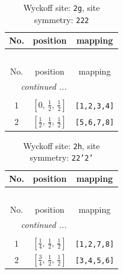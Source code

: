 \documentclass[fleqn,8pt]{jsarticle}
\begin{document}
\begin{longtable}{ccc}
\caption{Wyckoff site: {\tt 2g}, site symmetry: {\tt 222}}
 \\
 \hline \hline
No. & position & mapping \\ \hline \endfirsthead

\multicolumn{2}{l}{\tablename\ \thetable{}} \\
 \hline \hline
No. & position & mapping \\ \hline \endhead

 \hline \hline
\multicolumn{2}{r}{\footnotesize\it continued ...} \\ \endfoot

 \hline \hline
\multicolumn{2}{r}{} \\ \endlastfoot

1 & $\left[ 0,\, \frac{1}{2},\, \frac{1}{2} \right]$ & {\tt [1,2,3,4]} \\ \hline
2 & $\left[ \frac{1}{2},\, \frac{1}{2},\, \frac{1}{2} \right]$ & {\tt [5,6,7,8]} \\
\end{longtable}
\renewcommand{\arraystretch}{1.2}
\begin{longtable}{ccc}
\caption{Wyckoff site: {\tt 2h}, site symmetry: {\tt 22'2'}}
 \\
 \hline \hline
No. & position & mapping \\ \hline \endfirsthead

\multicolumn{2}{l}{\tablename\ \thetable{}} \\
 \hline \hline
No. & position & mapping \\ \hline \endhead

 \hline \hline
\multicolumn{2}{r}{\footnotesize\it continued ...} \\ \endfoot

 \hline \hline
\multicolumn{2}{r}{} \\ \endlastfoot

1 & $\left[ \frac{1}{4},\, \frac{1}{2},\, \frac{1}{2} \right]$ & {\tt [1,2,7,8]} \\ \hline
2 & $\left[ \frac{3}{4},\, \frac{1}{2},\, \frac{1}{2} \right]$ & {\tt [3,4,5,6]} \\
\end{longtable}
\renewcommand{\arraystretch}{1.2}
\end{document}
